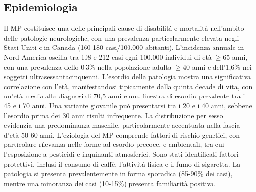 \subsection{Epidemiologia}
Il MP costituisce una delle principali cause di disabilità e mortalità nell'ambito delle patologie neurologiche, con una prevalenza particolarmente elevata negli Stati Uniti e in Canada (160-180 casi/100.000 abitanti). L'incidenza annuale in Nord America oscilla tra 108 e 212 casi ogni 100.000 individui di età $\geq$65 anni, con una prevalenza dello 0,3\% nella popolazione adulta $\geq$40 anni e dell'1,6\% nei soggetti ultrasessantacinquenni.
L'esordio della patologia mostra una significativa correlazione con l'età, manifestandosi tipicamente dalla quinta decade di vita, con un'età media alla diagnosi di 70,5 anni e una finestra di esordio prevalente tra i 45 e i 70 anni. Una variante giovanile può presentarsi tra i 20 e i 40 anni, sebbene l'esordio prima dei 30 anni risulti infrequente. La distribuzione per sesso evidenzia una predominanza maschile, particolarmente accentuata nella fascia d'età 50-60 anni.
L'eziologia del MP comprende fattori di rischio genetici, con particolare rilevanza nelle forme ad esordio precoce, e ambientali, tra cui l'esposizione a pesticidi e inquinanti atmosferici. Sono stati identificati fattori protettivi, inclusi il consumo di caffè, l'attività fisica e il fumo di sigaretta. La patologia si presenta prevalentemente in forma sporadica (85-90\% dei casi), mentre una minoranza dei casi (10-15\%) presenta familiarità positiva.

